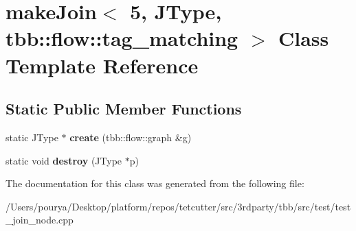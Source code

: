 \hypertarget{classmakeJoin_3_015_00_01JType_00_01tbb_1_1flow_1_1tag__matching_01_4}{}\section{make\+Join$<$ 5, J\+Type, tbb\+:\+:flow\+:\+:tag\+\_\+matching $>$ Class Template Reference}
\label{classmakeJoin_3_015_00_01JType_00_01tbb_1_1flow_1_1tag__matching_01_4}
\subsection*{Static Public Member Functions}
\begin{DoxyCompactItemize}
\item 
\hypertarget{classmakeJoin_3_015_00_01JType_00_01tbb_1_1flow_1_1tag__matching_01_4_ad2760e35b72e20ea872d0ab9b875b88f}{}static J\+Type $\ast$ {\bfseries create} (tbb\+::flow\+::graph \&g)\label{classmakeJoin_3_015_00_01JType_00_01tbb_1_1flow_1_1tag__matching_01_4_ad2760e35b72e20ea872d0ab9b875b88f}

\item 
\hypertarget{classmakeJoin_3_015_00_01JType_00_01tbb_1_1flow_1_1tag__matching_01_4_a8db40bbb639afb78eee597c5ee16e29c}{}static void {\bfseries destroy} (J\+Type $\ast$p)\label{classmakeJoin_3_015_00_01JType_00_01tbb_1_1flow_1_1tag__matching_01_4_a8db40bbb639afb78eee597c5ee16e29c}

\end{DoxyCompactItemize}


The documentation for this class was generated from the following file\+:\begin{DoxyCompactItemize}
\item 
/\+Users/pourya/\+Desktop/platform/repos/tetcutter/src/3rdparty/tbb/src/test/test\+\_\+join\+\_\+node.\+cpp\end{DoxyCompactItemize}

